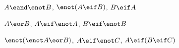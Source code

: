 \begin{compactlist}
\item $A \eand \enot B$, $\enot(A \eif B)$, $B \eif A$\vspace{.5ex} %


\item $A \eor B$, $A \eif \enot A$, $B \eif \enot B$ \vspace{.5ex}%


\item $\enot(\enot A \eor B) $, $A \eif \enot C$, $A \eif (B \eif C)$\vspace{.5ex} %


\end{compactlist}

